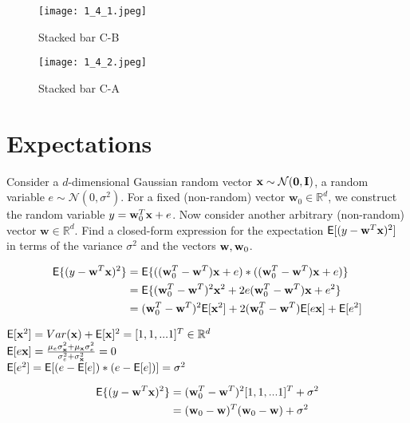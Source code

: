\documentclass[article,11pt]{article}
\begin{document}

\begin{figure}[!h]
	\centering
	\begin{minipage}{.45\textwidth}
		\centering
		\hspace*{0em}\texttt{[image: 1\_4\_1.jpeg]}
		\caption{Stacked bar C-B}
		\label{fig:cats3}
	\end{minipage}\hspace{1cm}
	\begin{minipage}{.45\textwidth}
		\centering
		\hspace*{0em}\texttt{[image: 1\_4\_2.jpeg]}
		\caption{Stacked bar C-A}
		\label{fig:cats4}
	\end{minipage}
\end{figure}
\newpage
\section{Expectations}
Consider a $d$-dimensional Gaussian random vector ${\bf x} \sim \mathcal{N}(\mathbf{0},\mathbf{I})$, 
a random variable $e \sim \mathcal{N}(0,\sigma^{2})$. 
For a fixed (non-random) vector $\mathbf{w}_{0} \in \mathbb{R}^{d}$, we construct the random variable $y= {\bf w}_{0}^{T} {\bf x} + e$. 
Now consider another arbitrary (non-random) vector $\mathbf{w} \in \mathbb{R}^{d}$. 
Find a closed-form expression for the expectation $\mathsf{E} [ ( y - {\bf w}^{T} {\bf x} )^{2} ]$ in terms of the variance $\sigma^{2}$ and the vectors ${\bf w}, {\bf w}_{0}$. 


\begin{align*}
\mathsf{E} \{( y - {\bf w}^{T} {\bf x} )^{2} \} & =\mathsf{E} \{ (({\bf w}_{0}^{T}-{\bf w}^{T}){\bf x}+e) * (({\bf w}_{0}^{T}-{\bf w}^{T}){\bf x}+e)\} \\
& = \mathsf{E} \{ ({\bf w}_{0}^{T}-{\bf w}^{T})^{2}{\bf x}^{2} + 2e({\bf w}_{0}^{T}-{\bf w}^{T}){\bf x}+e^{2} \} \\
& = ({\bf w}_{0}^{T}-{\bf w}^{T})^{2} \mathsf{E} [{\bf x}^{2}] + 2({\bf w}_{0}^{T}-{\bf w}^{T})\mathsf{E}[e{\bf x}]+\mathsf{E}[e^{2}]
\end{align*}

\begin{center}
	$\mathsf{E}[{\bf x}^{2}]=Var({\bf x})+\mathsf{E}[{\bf x}]^{2} = [1,1,...1]^{T} \in \mathbb{R}^{d}$ \\
	$\mathsf{E}[e{\bf x}]=\frac{\mu_{e}\sigma_{{\bf x}}^2+\mu_{{\bf x}}\sigma_{e}^2}{\sigma_{e}^{2}+\sigma_{{\bf x}}^{2}}=0 $ \\
	$\mathsf{E}[e^{2}]=\mathsf{E}[(e-\mathsf{E}[e])*(e-\mathsf{E}[e])]=\sigma^{2}$
\end{center}

\begin{align*}
	\mathsf{E} \{( y - {\bf w}^{T} {\bf x} )^{2} \}&=({\bf w}_{0}^{T}-{\bf w}^{T})^{2}[1,1,...1]^{T}+\sigma^{2} \\
	  &=({\bf w}_{0}-{\bf w})^{T}({\bf w}_{0}-{\bf w})+\sigma^{2}
\end{align*}
\end{document}
